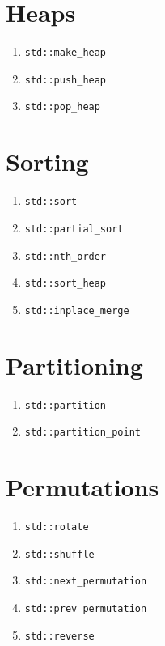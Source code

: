 \documentclass{article}
\begin{document}
\thispagestyle{empty}
\RaggedRight
\setlength{\columnseprule}{0.4pt}

\begin{multicols}{3}
\section{Heaps}
\begin{enumerate}
\setlength\itemsep{0em}
\item \texttt{std::make\_heap}
\item \texttt{std::push\_heap}
\item \texttt{std::pop\_heap}
\end{enumerate}

\section{Sorting}
\begin{enumerate}[resume]
\setlength\itemsep{0em}
\item \texttt{std::sort}
\item \texttt{std::partial\_sort}
\item \texttt{std::nth\_order}
\item \texttt{std::sort\_heap}
\item \texttt{std::inplace\_merge}
\end{enumerate}

\section{Partitioning}
\begin{enumerate}[resume]
\setlength\itemsep{0em}
\item \texttt{std::partition}
\item \texttt{std::partition\_point}
\end{enumerate}

\section{Permutations}
\begin{enumerate}[resume]
\setlength\itemsep{0em}
\item \texttt{std::rotate}
\item \texttt{std::shuffle}
\item \texttt{std::next\_permutation}
\item \texttt{std::prev\_permutation}
\item \texttt{std::reverse}
\end{enumerate}


\end{multicols}
\end{document}
